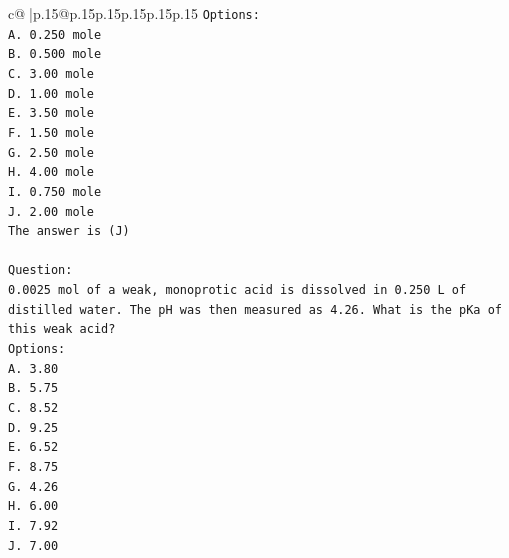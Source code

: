\documentclass{article}
\begin{document}
{\begin{supertabular}{c@{$\;$}|p{.15\linewidth}@{}p{.15\linewidth}p{.15\linewidth}p{.15\linewidth}p{.15\linewidth}p{.15\linewidth}}
{{{\texttt{Options:} \\
\texttt{A. 0.250 mole} \\
\texttt{B. 0.500 mole} \\
\texttt{C. 3.00 mole} \\
\texttt{D. 1.00 mole} \\
\texttt{E. 3.50 mole} \\
\texttt{F. 1.50 mole} \\
\texttt{G. 2.50 mole} \\
\texttt{H. 4.00 mole} \\
\texttt{I. 0.750 mole} \\
\texttt{J. 2.00 mole} \\
\texttt{The answer is (J)} \\
\\ 
\texttt{Question:} \\
\texttt{0.0025 mol of a weak, monoprotic acid is dissolved in 0.250 L of distilled water. The pH was then measured as 4.26. What is the pKa of this weak acid?} \\
\texttt{Options:} \\
\texttt{A. 3.80} \\
\texttt{B. 5.75} \\
\texttt{C. 8.52} \\
\texttt{D. 9.25} \\
\texttt{E. 6.52} \\
\texttt{F. 8.75} \\
\texttt{G. 4.26} \\
\texttt{H. 6.00} \\
\texttt{I. 7.92} \\
\texttt{J. 7.00} \\
            }
        }
    }
     \\ \\


\end{supertabular}}
\end{document}
